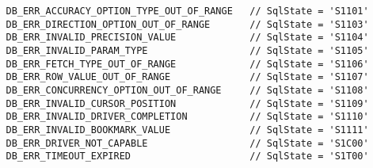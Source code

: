 \begin{verbatim}
   DB_ERR_ACCURACY_OPTION_TYPE_OUT_OF_RANGE   // SqlState = 'S1101'
   DB_ERR_DIRECTION_OPTION_OUT_OF_RANGE       // SqlState = 'S1103'
   DB_ERR_INVALID_PRECISION_VALUE             // SqlState = 'S1104'
   DB_ERR_INVALID_PARAM_TYPE                  // SqlState = 'S1105'
   DB_ERR_FETCH_TYPE_OUT_OF_RANGE             // SqlState = 'S1106'
   DB_ERR_ROW_VALUE_OUT_OF_RANGE              // SqlState = 'S1107'
   DB_ERR_CONCURRENCY_OPTION_OUT_OF_RANGE     // SqlState = 'S1108'
   DB_ERR_INVALID_CURSOR_POSITION             // SqlState = 'S1109'
   DB_ERR_INVALID_DRIVER_COMPLETION           // SqlState = 'S1110'
   DB_ERR_INVALID_BOOKMARK_VALUE              // SqlState = 'S1111'
   DB_ERR_DRIVER_NOT_CAPABLE                  // SqlState = 'S1C00'
   DB_ERR_TIMEOUT_EXPIRED                     // SqlState = 'S1T00'
\end{verbatim}


